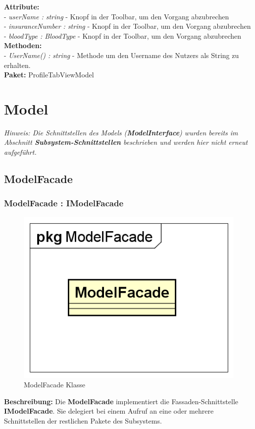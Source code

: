 \documentclass[a4paper]{scrreprt}
\begin{document}
\textbf{Attribute:}\\
- \textit{userName : string} - Knopf in der Toolbar, um den Vorgang abzubrechen\\
- \textit{insuranceNumber : string} - Knopf in der Toolbar, um den Vorgang abzubrechen\\
- \textit{bloodType : BloodType} - Knopf in der Toolbar, um den Vorgang abzubrechen\\

\textbf{Methoden:}\\
- \textit{UserName() : string} - Methode um den Username des Nutzers als String zu erhalten.\\

\textbf{Paket:} ProfileTabViewModel

\section{Model}
\textit{Hinweis: Die Schnittstellen des Models (\textbf{ModelInterface}) wurden bereits im Abschnitt \textbf{Subsystem-Schnittstellen} beschrieben und werden hier nicht erneut aufgeführt.}

\subsection{ModelFacade}
\subsubsection{ModelFacade : IModelFacade}
\begin{figure}[H]
\centering
\includegraphics[width=0.45\textheight]{graphics/Klassendiagramme/Model/ModelFacade.png}
\caption{ModelFacade Klasse}
\end{figure}
\textbf{Beschreibung:} Die \textbf{ModelFacade} implementiert die Fassaden-Schnittstelle \textbf{IModelFacade}. Sie delegiert bei einem Aufruf an eine oder mehrere Schnittstellen der restlichen Pakete des Subsystems.
\end{document}
